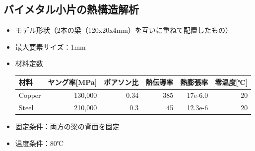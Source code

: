 \documentclass[a4j,20pt,slide]{ltjsarticle}
\begin{document}
\subsection{バイメタル小片の熱構造解析}
\begin{itemize}
	\item モデル形状（2本の梁（120x20x4mm）を互いに重ねて配置したもの）
	\item 最大要素サイズ：1mm
	\item 材料定数
	      \vspace{-.5\baselineskip}
	      \begin{table}[H]
		      \centering
		      \begin{tabular}{@{}lrrrrr@{}}
			      \toprule
			      材料   & ヤング率{[}MPa{]} & ポアソン比 & 熱伝導率 & 熱膨張率 & 零温度{[}℃{]} \\ \midrule
			      Copper & 130,000           & 0.34       & 385      & 17e-6.0  & 20            \\
			      Steel  & 210,000           & 0.3        & 45       & 12.3e-6  & 20            \\ \bottomrule
		      \end{tabular}
	      \end{table}
	      \vspace{-\baselineskip}
	\item 固定条件：両方の梁の背面を固定
	\item 温度条件：80℃
\end{itemize}
\vspace{-\baselineskip}
\end{document}
